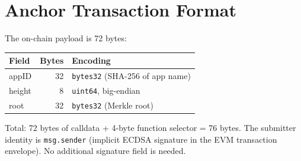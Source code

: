 \section{Anchor Transaction Format}

\label{sec:format}

The on-chain payload is 72 bytes:

\begin{center}
\begin{tabular}{lrl}
\toprule
\textbf{Field} & \textbf{Bytes} & \textbf{Encoding} \\
\midrule
appID  & 32 & \texttt{bytes32} (SHA-256 of app name) \\
height & 8  & \texttt{uint64}, big-endian \\
root   & 32 & \texttt{bytes32} (Merkle root) \\
\bottomrule
\end{tabular}
\end{center}

\noindent
Total: 72 bytes of calldata + 4-byte function selector = 76 bytes.
The submitter identity is \texttt{msg.sender} (implicit ECDSA signature
in the EVM transaction envelope). No additional signature field is needed.

